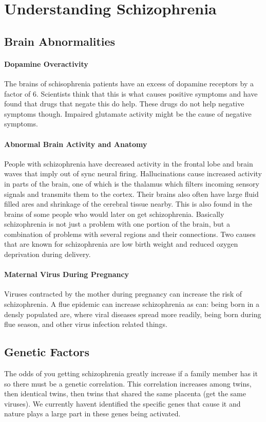 \documentclass[12pt]{article}
\begin{document}
\section*{Understanding Schizophrenia}
\subsection*{Brain Abnormalities}
\paragraph*{Dopamine Overactivity}
The brains of schisophrenia patients have an excess of dopamine receptors by a factor of 6. Scientists think that this is what causes positive symptoms and have found that drugs that negate this do help. These drugs do not help negative symptoms though. Impaired glutamate activity might be the cause of negative symptoms.
\paragraph*{Abnormal Brain Activity and Anatomy}
People with schizophrenia have decreased activity in the frontal lobe and brain waves that imply out of sync neural firing. Hallucinations cause increased activity in parts of the brain, one of which is the thalamus which filters incoming sensory signals and transmits them to the cortex. Their brains also often have large fluid filled ares and shrinkage of the cerebral tissue nearby. This is also found in the brains of some people who would later on get schizophrenia. Basically schizophrenia is not just a problem with one portion of the brain, but a combination of problems with several regions and their connections. Two causes that are known for schizophrenia are low birth weight and reduced ozygen deprivation during delivery. 
\paragraph*{Maternal Virus During Pregnancy}
Viruses contracted by the mother during pregnancy can increase the risk of schizophrenia. A flue epidemic can increase schizophrenia as can: being born in a densly populated are, where viral diseases spread more readily, being born during flue season, and other virus infection related things. 
\subsection*{Genetic Factors}
The odds of you getting schizophrenia greatly increase if a family member has it so there must be a genetic correlation. This correlation increases among twins, then identical twins, then twins that shared the same placenta (get the same viruses). We currently havent identified the specific genes that cause it and nature plays a large part in these genes being activated.
\end{document}
